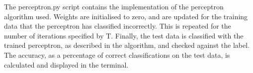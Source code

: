 \documentclass[10pt,twocolumn,a4paper]{article}
\begin{document}
The perceptron.py script contains the implementation of the perceptron algorithm used. Weights are initialised to zero, and are updated for the training data that the perceptron has classified incorrectly. This is repeated for the number of iterations specified by T. Finally, the test data is classified with the trained perceptron, as described in the algorithm, and checked against the label. The accuracy, as a percentage of correct classifications on the test data, is calculated and displayed in the terminal.


{\small


}
\end{document}
